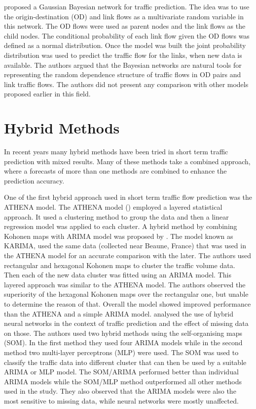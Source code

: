 \citet{castillo2008predicting} proposed a Gaussian Bayesian network for traffic prediction. The idea
was to use the origin-destination (OD) and link flows as a multivariate random variable in this network.
The OD flows were used as parent nodes and the link flows as the child nodes. The conditional
probability of each link flow given the OD flows was defined as a normal distribution. Once the model
was built the joint probability distribution was used to predict the traffic flow for the links, when
new data is available. The authors argued that the Bayesian networks are natural tools for representing
the random dependence structure of traffic flows in OD pairs and link traffic flows. The authors did not
present any comparison with other models proposed earlier in this field.


\section{Hybrid Methods}
In recent years many hybrid methods have been tried in short term traffic prediction with mixed
results. Many of these methods take a combined approach, where a forecasts of more than one methods
are combined to enhance the prediction accuracy.

One of the first hybrid approach used in short term traffic flow prediction was the ATHENA model.
The ATHENA model (\citet{danech1991athena}) employed a layered statistical approach. It
used a clustering method to group the data and then a linear regression model was applied
to each cluster. A hybrid method by combining Kohonen maps with ARIMA model was proposed by
\citet{van1996combining}. The model known as KARIMA, used the same data (collected near Beaune,
France) that was used in the ATHENA model for an accurate comparison with the later. The authors
used rectangular and hexagonal Kohonen maps to cluster the traffic volume data. Then each of the
new data cluster was fitted using an ARIMA model. This layered approach was similar to the ATHENA
model. The authors observed the superiority of the hexagonal Kohonen maps over the rectangular one,
but unable to determine the reason of that. Overall the model showed improved performance than the
ATHENA and a simple ARIMA model. \citet{chen2001study} analysed the use of hybrid neural
networks in the context of traffic prediction and the effect of missing data on those.
The authors used two hybrid methods using the self-organising maps (SOM). In the first method they
used four ARIMA models while in the second method two multi-layer perceptrons (MLP) were used.
The SOM was used to classify the traffic data into different cluster that can then be used by a
suitable ARIMA or MLP model. The SOM/ARIMA performed better than individual ARIMA models while the
SOM/MLP method outperformed all other methods used in the study. They also observed that the ARIMA
models were also the most sensitive to missing data, while neural networks were mostly unaffected.


